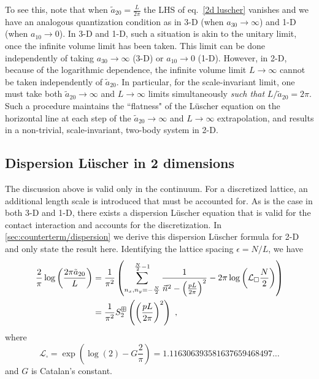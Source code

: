 To see this, note that when $\tilde a_{20}=\frac{L}{2\pi}$ the LHS of eq.~\eqref{2d luscher} vanishes and we have an analogous quantization condition as in 3-D (when $a_{30}\to\infty$) and 1-D (when $a_{10}\to 0$).  In 3-D and 1-D, such a situation is akin to the unitary limit, once the infinite volume limit has been taken.  This limit can be done independently of taking $a_{30}\to\infty$ (3-D) or $a_{10}\to0$ (1-D).  However, in 2-D, because of the logarithmic dependence, the infinite volume limit $L\to\infty$ cannot be taken independently of $\tilde a_{20}$.  In particular, for the scale-invariant limit, one must take both $\tilde a_{20}\to \infty$ and $L\to\infty$ limits simultaneously \emph{such that} $L/\tilde a_{20}=2\pi$.  Such a procedure maintains the ``flatness" of the L\"uscher equation on the horizontal line at each step of the $\tilde a_{20}\to\infty$ and $L\to\infty$ extrapolation, and results in a non-trivial, scale-invariant, two-body system in 2-D.  

\subsection{Dispersion L\"uscher in 2 dimensions}
The discussion above is valid only in the continuum.  For a discretized lattice, an additional length scale is introduced that must be accounted for.  As is the case in both 3-D and 1-D, there exists a dispersion L\"uscher equation that is valid for the contact interaction and accounts for the discretization.  In \autoref{sec:counterterm/dispersion} we derive this dispersion L\"uscher formula for 2-D and only state the result here.  Identifying the lattice spacing $\epsilon=N/L$, we have
\begin{align}
\frac{2}{\pi} \log \left(\frac{2\pi \tilde a_{20}}{L}\right)&=\frac{1}{\pi^2}\left( \sum_{n_x,n_y=-\frac{N}{2}}^{\frac{N}{2}-1}\frac{1}{\vec{n}^2-\left(\frac{pL}{2\pi}\right)^2}-2\pi \log \left(\mathcal{L}_\square\frac{N}{2}\right)\right)\nonumber\\
&=\frac{1}{\pi^2}S^{\dispersion}_2\left(\left(\frac{pL}{2\pi}\right)^2\right)\ ,\label{eq:2d dispersion luscher}
\end{align}
where
\begin{equation}
\mathcal{L}_{\square}=\exp \left(\log (2)-G \frac{2}{\pi}\right)=1.116306393581637659468497 \ldots
\end{equation}
and $G$ is Catalan's constant.  

